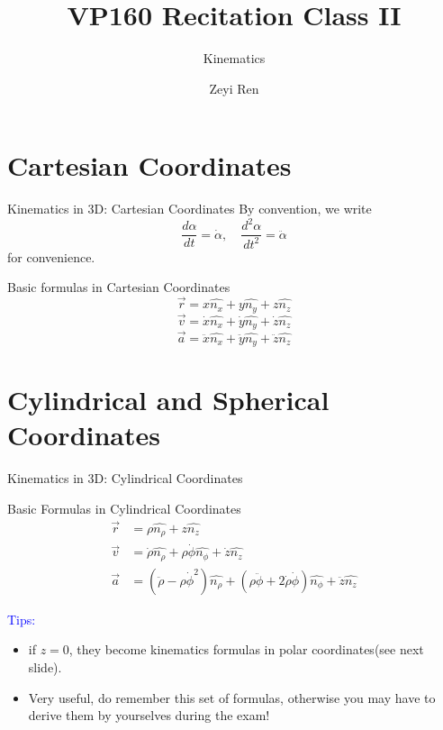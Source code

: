 \documentclass{beamer}
\title{VP160 Recitation Class II}
\subtitle{Kinematics}
\author{Zeyi Ren}
\institute{UM-SJTU Joint Institute}
\begin{document}
\maketitle

\frame{\tableofcontents}

\section{Cartesian Coordinates}
\begin{frame}{Kinematics in 3D: Cartesian Coordinates}
  By convention, we write$$
  \frac{d\alpha}{dt}=\dot{\alpha},\quad \frac{d^2\alpha}{dt^2}=\ddot{\alpha}$$for convenience.\pause
  \begin{block}{Basic formulas in Cartesian Coordinates}
  $$ 
  \vec{r} = x\hat{n_x} + y\hat{n_y} + z\hat{n_z}$$
  $$
  \vec{v} = \dot{x}\hat{n_x} + \dot{y}\hat{n_y} + \dot{z}\hat{n_z}$$
  $$
  \vec{a} = \ddot{x}\hat{n_x} + \ddot{y}\hat{n_y} + \ddot{z}\hat{n_z}
  $$
\end{block}
\end{frame}

\section{Cylindrical and Spherical Coordinates}
\begin{frame}{Kinematics in 3D: Cylindrical Coordinates}
  \begin{block}{Basic Formulas in Cylindrical Coordinates}
    \begin{align*}\vec{r}&=\rho\hat{n_\rho}+z\hat{n_z}\\
  \vec{v}&=\dot{\rho}\hat{n_\rho}+\rho\dot{\phi}\hat{n_\phi}+\dot{z}\hat{n_z}\\
  \vec{a}&=(\ddot{\rho}-\rho\dot{\phi}^2)\hat{n_\rho}+(\rho\ddot{\phi}+2\dot{\rho}\dot{\phi})\hat{n_\phi}+\ddot{z}\hat{n_z}
  \end{align*}
\end{block}\pause
  \textcolor{blue}{Tips:}\\
  \begin{itemize}
    \item if $z=0$, they become kinematics formulas in polar coordinates(see next slide).\pause
    \item Very useful, do remember this set of formulas, otherwise you may have to
    derive them by yourselves during the exam!
  \end{itemize}
\end{frame}
\end{document}
